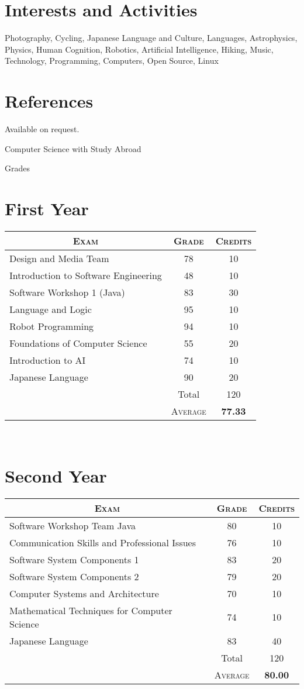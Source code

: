\documentclass[a4paper,10pt]{article}
\begin{document}
\section{Interests and Activities}
Photography, Cycling, Japanese Language and Culture, Languages,
Astrophysics, Physics, Human Cognition, Robotics, Artificial
Intelligence, Hiking, Music, Technology, Programming, Computers, Open
Source, Linux
\section{References}
Available on request.

\newpage
\par{\centering\Large \hypertarget{bham_ug}{Computer Science with
    Study Abroad}\par}\large{\centering Grades\par}\normalsize
\begin{center}
  \section{First Year}
  \begin{tabular}{lcc}
    \multicolumn{1}{c}{\textsc{Exam}}&\textsc{Grade}&\textsc{Credits}\\ \hline
    Design and Media Team&78&	10\\
    Introduction to Software Engineering	&48&	10\\
    Software Workshop 1 (Java)	&83&	30\\
    Language and Logic	&95&	10\\
    Robot Programming	&94&	10\\
    Foundations of Computer Science	&55	&20\\
    Introduction to AI	&74&	10\\
    Japanese Language	&90&	20\\
    & Total&120\\\cline{2-3}
    &\textsc{Average}&\textbf{77.33}\\
  \end{tabular}\\
  \section{Second Year}
  \begin{tabular}{lcc}
    \multicolumn{1}{c}{\textsc{Exam}}&\textsc{Grade}&\textsc{Credits}\\ \hline
    Software Workshop Team Java&80&	10\\
    Communication Skills and Professional Issues	&76&	10\\
    Software System Components 1	&83&	20\\
    Software System Components 2	&79&	20\\
    Computer Systems and Architecture	&70&	10\\
    Mathematical Techniques for Computer Science	&74	&10\\
    Japanese Language	&83&	40\\
    & Total&120\\\cline{2-3}
    &\textsc{Average}&\textbf{80.00}
  \end{tabular}
\end{center}
\end{document}
